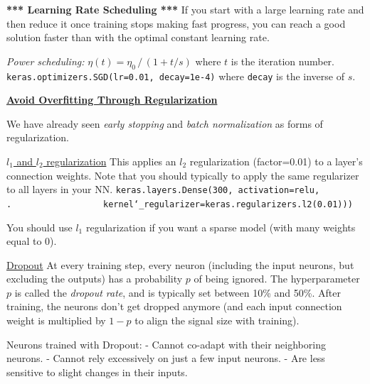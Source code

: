 \textbf{*** Learning Rate Scheduling ***}\newline
If you start with a large learning rate and then reduce it once training stops making fast progress,
you can reach a good solution faster than with the optimal constant learning rate.

\textit{Power scheduling:} $\eta(t) = \eta_0 \, / \, (1 + t/s)$ where $t$ is the iteration number.\newline
\texttt{keras.optimizers.SGD(lr=0.01, decay=1e-4)} where \texttt{decay} is the inverse of $s$.\newline

\newpage

\textbf{\underline{Avoid Overfitting Through Regularization}}

We have already seen \textit{early stopping} and \textit{batch normalization} as forms of regularization.\newline\newline

\underline{$l_1$ and $l_2$ regularization}\newline
This applies an $l_2$ regularization (factor=0.01) to a layer's connection weights.\newline
Note that you should typically to apply the same regularizer to all layers in your NN.\newline
\texttt{keras.layers.Dense(300, activation=\textquotesingle relu\textquotesingle,\newline
.~~~~~~~~~~~~~~~~~~kernel\char`_regularizer=keras.regularizers.l2(0.01)))}

You should use $l_1$ regularization if you want a sparse model (with many weights equal to 0).\newline\newline

\underline{Dropout}\newline
At every training step, every neuron (including the input neurons, but excluding the outputs)
has a probability $p$ of being ignored.
The hyperparameter $p$ is called the \textit{dropout rate},
and is typically set between 10\% and 50\%.
After training, the neurons don't get dropped anymore (and each input connection weight is multiplied by $1-p$ to align the signal size with training).

Neurons trained with Dropout:\newline
- Cannot co-adapt with their neighboring neurons.\newline
- Cannot rely excessively on just a few input neurons.\newline
- Are less sensitive to slight changes in their inputs.

